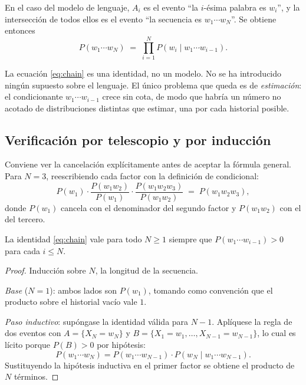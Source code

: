 \documentclass[11pt,letterpaper]{article}
\begin{document}
En el caso del modelo de lenguaje, $A_i$ es el evento ``la $i$-ésima palabra es
$w_i$'', y la intersección de todos ellos es el evento ``la secuencia es
$w_1\cdots w_N$''. Se obtiene entonces
\begin{equation}\label{eq:chain}
P(w_1\cdots w_N) \;=\; \prod_{i=1}^{N} P(w_i \mid w_1\cdots w_{i-1}).
\end{equation}

\begin{idea}[title={La factorización no aproxima nada}]
La ecuación \eqref{eq:chain} es una identidad, no un modelo. No se ha
introducido ningún supuesto sobre el lenguaje. El único problema que queda es de
\emph{estimación}: el condicionante $w_1\cdots w_{i-1}$ crece sin cota, de modo
que habría un número no acotado de distribuciones distintas que estimar, una por
cada historial posible.
\end{idea}

\subsection{Verificación por telescopio y por inducción}

Conviene ver la cancelación explícitamente antes de aceptar la fórmula general.
Para $N=3$, reescribiendo cada factor con la definición de condicional:
\[
P(w_1)\cdot\frac{P(w_1w_2)}{P(w_1)}\cdot\frac{P(w_1w_2w_3)}{P(w_1w_2)} \;=\;
P(w_1w_2w_3),
\]
donde $P(w_1)$ cancela con el denominador del segundo factor y $P(w_1w_2)$ con
el del tercero.

\begin{proposicion}
La identidad \eqref{eq:chain} vale para todo $N\ge 1$ siempre que $P(w_1\cdots
w_{i-1})>0$ para cada $i\le N$.
\end{proposicion}

\begin{proof}
Inducción sobre $N$, la longitud de la secuencia.

\emph{Base} ($N=1$): ambos lados son $P(w_1)$, tomando como convención que el
producto sobre el historial vacío vale $1$.

\emph{Paso inductivo}: supóngase la identidad válida para $N-1$. Aplíquese la
regla de dos eventos con $A=\{X_N=w_N\}$ y
$B=\{X_1=w_1,\dots,X_{N-1}=w_{N-1}\}$, lo cual es lícito porque $P(B)>0$ por
hipótesis:
\[
P(w_1\cdots w_N) = P(w_1\cdots w_{N-1})\cdot P(w_N\mid w_1\cdots w_{N-1}).
\]
Sustituyendo la hipótesis inductiva en el primer factor se obtiene el producto
de $N$ términos. \qedhere
\end{proof}
\end{document}
